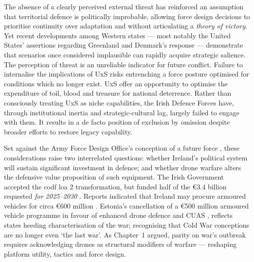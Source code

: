 The absence of a clearly perceived external threat has reinforced an assumption that territorial defence is politically improbable, allowing force design decisions to prioritise continuity over adaptation and without articulating a \textit{theory of victory}. Yet recent developments among Western states --- most notably the United States' assertions regarding Greenland \parencite[h.~972]{us_congress_2025_congressional_record_119_1} and Denmark's response \parencite{statsministeriet_2026_faellesudtalelse_groenland} --- demonstrate that scenarios once considered implausible can rapidly acquire strategic salience. The perception of threat is an unreliable indicator for future conflict. Failure to internalise the implications of UxS risks entrenching a force posture optimised for conditions which no longer exist. UxS offer an opportunity to optimise the expenditure of toil, blood and treasure for national deterrence. Rather than consciously treating UxS as niche capabilities, the Irish Defence Forces have, through institutional inertia and strategic-cultural lag, largely failed to engage with them. It results in a de facto position of exclusion by omission despite broader efforts to restore legacy capability.

Set against the Army Force Design Office's conception of a future force \parencite{Army_force_Design,DPR_2024}, these considerations raise two interrelated questions: whether Ireland's political system will sustain significant investment in defence; and whether drone warfare alters the defensive value proposition of such equipment. The Irish Government accepted the \gls{codf} \gls{loa} 2 transformation, but funded half of the \euro3.4 billion requested \emph{for 2025--2030} \parencite{WALL_2025a}. Reports indicated that Ireland may procure armoured vehicles for circa \euro600 million \parencite{Cabirol,NOC_2026}. Estonia’s cancellation of a \euro500 million armoured vehicle programme in favour of enhanced drone defence and CUAS \parencite{ERRNews}, reflects states heeding  characterisation of the war; recognising that Cold War conceptions are no longer even `the last war'. As Chapter~1 argued, parity on war's outbreak requires acknowledging drones as structural modifiers of warfare --- reshaping platform utility, tactics and force design.


